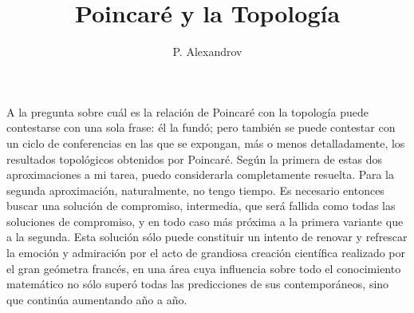 \documentclass[a4paper, 12pt]{article}
\title{Poincaré y la Topología}
\author{P. Alexandrov}
\date{}
\begin{document}
\begin{tcolorbox}[colback=blue!5!white,colframe=blue!75!black]

\vspace{-1.8cm}
\textbf \maketitle

\end{tcolorbox}

\bigskip


A la pregunta sobre cuál es la relación de Poincaré con la topología puede contestarse con una sola frase: él la fundó; pero también se puede contestar con un ciclo de conferencias en las que se expongan, más o menos detalladamente, los resultados topológicos obtenidos por Poincaré. Según la primera de estas dos aproximaciones a mi tarea, puedo considerarla completamente resuelta. Para la segunda aproximación, naturalmente, no tengo tiempo. Es necesario entonces buscar  una solución de compromiso, intermedia, que será fallida como todas las soluciones de compromiso, y en todo caso más próxima a la primera variante que a la segunda. Esta solución sólo puede constituir un intento de renovar y refrescar la emoción y admiración por el acto de grandiosa creación científica realizado por el 
gran geómetra francés, en una área cuya influencia sobre todo el conocimiento matemático no sólo superó todas las predicciones de sus contemporáneos, sino que 
continúa aumentando año a año.
\end{document}
